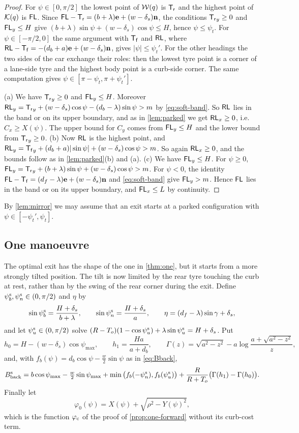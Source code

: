 \begin{proof}
For $\psi\in[0,\pi/2]$ the lowest point of $\mathcal{W}(q)$ is $\mathsf{T_r}$ and the highest point of $\mathcal{K}(q)$ is $\mathsf{FL}$.
Since $\mathsf{FL}-\mathsf{T_r}=(b+\lambda)\mathbf{e}+(w-\delta_s)\mathbf{n}$, the conditions $\mathsf{T_r}_y\ge0$ and $\mathsf{FL}_y\le H$ give $(b+\lambda)\sin\psi+(w-\delta_s)\cos\psi\le H$, hence $\psi\le\psi_t$.
For $\psi\in[-\pi/2,0]$ the same argument with $\mathsf{T_f}$ and $\mathsf{RL}$, where $\mathsf{RL}-\mathsf{T_f}=-(d_b+a)\mathbf{e}+(w-\delta_s)\mathbf{n}$, gives $|\psi|\le\psi_t'$.
For the other headings the two sides of the car exchange their roles: then the lowest tyre point is a corner of a lane-side tyre and the highest body point is a curb-side corner.
The same computation gives $\psi\in[\pi-\psi_t,\pi+\psi_t']$.

(a) We have $\mathsf{T_r}_y\ge0$ and $\mathsf{FL}_y\le H$.
Moreover $\mathsf{RL}_y=\mathsf{T_r}_y+(w-\delta_s)\cos\psi-(d_b-\lambda)\sin\psi>m$ by \eqref{eq:soft-band}.
So $\mathsf{RL}$ lies in the band or on its upper boundary, and as in \cref{lem:parked} we get $\mathsf{RL}_x\ge0$, i.e.\ $C_x\ge X(\psi)$.
The upper bound for $C_y$ comes from $\mathsf{FL}_y\le H$ and the lower bound from $\mathsf{T_r}_y\ge0$.
(b) Now $\mathsf{RL}$ is the highest point, and $\mathsf{RL}_y=\mathsf{T_f}_y+(d_b+a)|\sin\psi|+(w-\delta_s)\cos\psi>m$.
So again $\mathsf{RL}_x\ge0$, and the bounds follow as in \cref{lem:parked}(b) and (a).
(c) We have $\mathsf{FL}_y\le H$.
For $\psi\ge0$, $\mathsf{FL}_y=\mathsf{T_r}_y+(b+\lambda)\sin\psi+(w-\delta_s)\cos\psi>m$.
For $\psi<0$, the identity $\mathsf{FL}-\mathsf{T_f}=(d_f-\lambda)\mathbf{e}+(w-\delta_s)\mathbf{n}$ and \eqref{eq:soft-band} give $\mathsf{FL}_y>m$.
Hence $\mathsf{FL}$ lies in the band or on its upper boundary, and $\mathsf{FL}_x\le L$ by continuity.
\end{proof}

By \cref{lem:mirror} we may assume that an exit starts at a parked configuration with $\psi\in[-\psi_t',\psi_t]$.

\subsection{One manoeuvre}
The optimal exit has the shape of the one in \cref{thm:one}, but it starts from a more strongly tilted position.
The tilt is now limited by the rear tyre touching the curb at rest, rather than by the swing of the rear corner during the exit.
Define $\psi_b^{\rm s},\psi_n^{\rm s}\in(0,\pi/2)$ and $\eta$ by
\[
  \sin\psi_b^{\rm s}=\frac{H+\delta_s}{b+\lambda},\qquad \sin\psi_n^{\rm s}=\frac{H+\delta_s}{a},\qquad \eta=(d_f-\lambda)\sin\gamma+\delta_s ,
\]
and let $\psi_u^{\rm s}\in(0,\pi/2)$ solve $(R-T_o)(1-\cos\psi_u^{\rm s})+\lambda\sin\psi_u^{\rm s}=H+\delta_s$.
Put
\[
  h_0=H-(w-\delta_s)\cos\psi_{\max},\qquad h_1=\frac{Ha}{a+d_b},\qquad \Gamma(z)=\sqrt{a^2-z^2}-a\log\frac{a+\sqrt{a^2-z^2}}{z},
\]
and, with $f_b(\psi)=d_b\cos\psi-\tfrac w2\sin\psi$ as in \eqref{eq:Bback},
\begin{equation}\label{eq:Bback-soft}
  B^{\rm s}_{\rm back}=b\cos\psi_{\max}-\tfrac w2\sin\psi_{\max}+\min\big(f_b(-\psi_n^{\rm s}),f_b(\psi_u^{\rm s})\big)+\frac{R}{R+T_o}\big(\Gamma(h_1)-\Gamma(h_0)\big).
\end{equation}
Finally let
\[
  \varphi_0(\psi)=X(\psi)+\sqrt{\rho^2-Y(\psi)^2},
\]
which is the function $\varphi_{\rm c}$ of the proof of \cref{prop:one-forward} without its curb-cost term.

